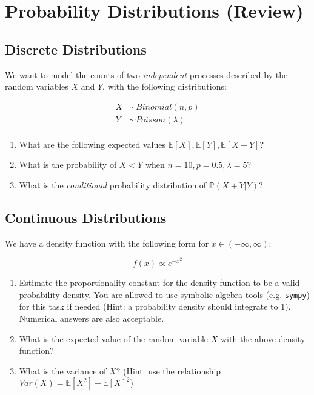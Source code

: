 \documentclass{pset}
\date{6/1/2025}
\begin{document}
\maketitle

\section*{Probability Distributions (Review)}

\subsection*{Discrete Distributions}

We want to model the counts of two \textit{independent} processes described by the random variables $X$ and $Y$, with the following distributions: 

$$
\begin{aligned}
X &\sim Binomial(n,p)\\
Y &\sim Poisson(\lambda)\\ 
\end{aligned}
$$

\begin{enumerate}
\item What are the following expected values $\mathbb{E}[X], \mathbb{E}[Y], \mathbb{E}[X + Y]$?
\item What is the probability of $X < Y$ when $n=10, p=0.5, \lambda=5$? 
\item What is the \textit{conditional} probability distribution of $\mathbb{P}(X + Y | Y)$?
\end{enumerate}

\subsection*{Continuous Distributions}

We have a density function with the following form for $x\in (-\infty, \infty)$: 

$$f(x) \propto e^{-x^2}$$

\begin{enumerate}
\item Estimate the proportionality constant for the density function to be a valid probability density. You are allowed to use symbolic algebra tools (e.g. \texttt{sympy}) for this task if needed (Hint: a probability density should integrate to 1). Numerical answers are also acceptable.
\item What is the expected value of the random variable $X$ with the above density function?
\item What is the variance of $X$? (Hint: use the relationship $Var(X) = \mathbb{E}[X^2] - \mathbb{E}[X]^2$)
\end{enumerate}
\end{document}
